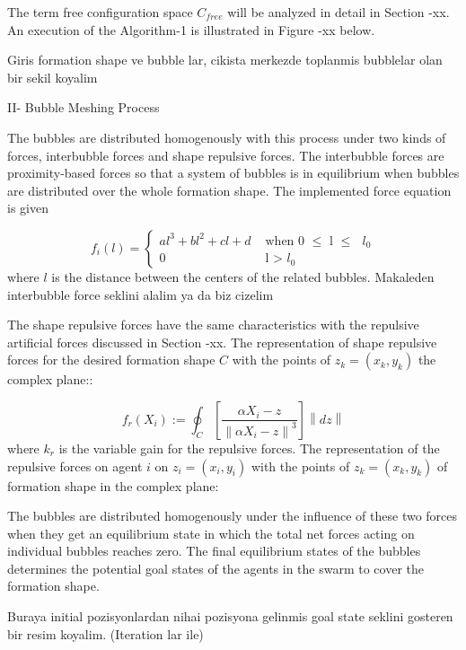\documentclass[twoside]{article}
\newcommand{\norm}[1]{\left\lVert#1\right\rVert}
\begin{document}
		The term free configuration space $C_{free}$ will be analyzed in detail in Section -xx. An execution of the Algorithm-1 is illustrated in Figure -xx below.
		
		Giris formation shape ve bubble lar, cikista merkezde toplanmis bubblelar olan bir sekil koyalim
		
		II- Bubble Meshing Process 
		
		The bubbles are distributed homogenously with this process under two kinds of forces, interbubble forces and shape repulsive forces. The interbubble forces are proximity-based forces so that a system of bubbles is in equilibrium when bubbles are distributed over the whole formation shape. The implemented force equation is given
		
		\begin{equation}
		f_i(l) = \left\{ \begin{array}{rl}
		al^3 + bl^2 + cl + d &\mbox{ when 0 $\leq$ l $\leq$ $l_0$} \\
		0                               &\mbox{ l > $l_0$}
		\end{array} \right.
		\end{equation}
	where $l$ is the distance between the centers of the related bubbles. 
	Makaleden interbubble force seklini alalim ya da biz cizelim
	
	The shape repulsive forces have the same characteristics with the repulsive artificial forces discussed in Section -xx. The representation of shape repulsive forces for the desired formation shape $C$ with the points of  $z_k = (x_k,y_k)$ the complex plane::
	
		
			\begin{equation}
			f_r(X_i) := \oint_C \left[\frac{\alpha X_i - z}{\norm{\alpha X_i - z}^3}\right] \norm{dz}
			\end{equation}
			where $k_r$ is the variable gain for the repulsive forces. The representation of the repulsive forces on agent $i$ on $z_i = (x_i, y_i)$ with the points of  $z_k = (x_k,y_k)$ of formation shape in the complex plane:
	
	The bubbles are distributed homogenously under the influence of these two forces when they get an equilibrium state in which the total net forces acting on individual bubbles reaches zero. The final equilibrium states of the bubbles determines the potential goal states of the agents in the swarm to cover the formation shape. 
	
	Buraya initial pozisyonlardan nihai pozisyona gelinmis goal state seklini gosteren bir resim koyalim. (Iteration lar ile)
	
\end{document}
